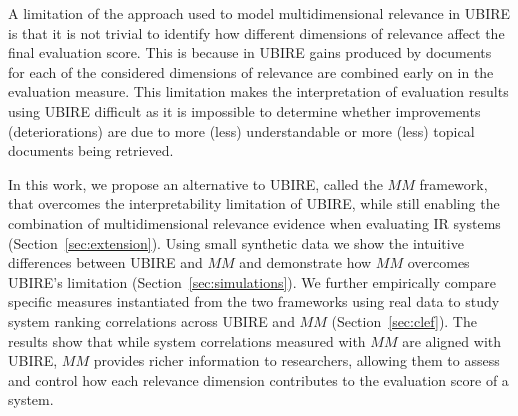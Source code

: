 A limitation of the approach used to model multidimensional relevance in UBIRE is that it is not trivial to identify how different dimensions of relevance affect the final evaluation score. This is because in UBIRE gains produced by documents for each of the considered dimensions of relevance are combined early on in the evaluation measure. This limitation makes the interpretation of evaluation results using UBIRE difficult as it is impossible to determine whether improvements (deteriorations) are due to more (less) understandable or more (less) topical documents being retrieved. 

In this work, we propose an alternative to UBIRE, called the $MM$ framework, that overcomes the interpretability limitation of UBIRE, while still enabling the combination of multidimensional relevance evidence when evaluating IR systems (Section~\ref{sec:extension}). Using small synthetic data we show the intuitive differences between UBIRE and $MM$ and demonstrate how $MM$ overcomes UBIRE's limitation (Section~\ref{sec:simulations}). We further empirically compare specific measures instantiated from the two frameworks using real data to study system ranking correlations across UBIRE and $MM$ (Section~\ref{sec:clef}). The results show that while system correlations measured with $MM$ are aligned with UBIRE, $MM$ provides richer information to researchers, allowing them to assess and control how each relevance dimension contributes to the evaluation score of a system.



